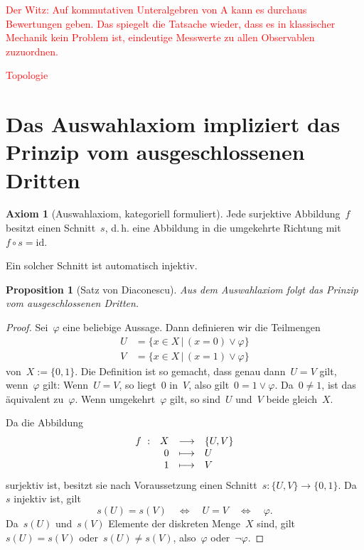 \documentclass[a4paper,ngerman,12pt]{scrartcl}
\theoremstyle{definition}
\newtheorem{axiom}[defn]{Axiom}
\theoremstyle{plain}
\newtheorem{prop}[defn]{Proposition}
\theoremstyle{remark}
\newcommand{\CC}{\mathbb{C}}
\newcommand{\C}{\mathcal{C}}
\newcommand{\id}{\mathrm{id}}
\renewcommand{\_}{\mathpunct{.}\,}
\newcommand{\?}{\,{:}\,}
\newcommand{\XXX}[1]{\textcolor{red}{#1}}
\begin{document}

\XXX{Der Witz: Auf kommutativen Unteralgebren von A kann es durchaus
Bewertungen geben. Das spiegelt die Tatsache wieder, dass es in
klassischer Mechanik kein Problem ist, eindeutige Messwerte zu allen
Observablen zuzuordnen.}

\XXX{Topologie}



\appendix
\section{Das Auswahlaxiom impliziert das Prinzip vom ausgeschlossenen Dritten}

\label{appendix:axc}%
\begin{axiom}[Auswahlaxiom, kategoriell formuliert]Jede surjektive
Abbildung~$f$ besitzt einen Schnitt~$s$, d.\,h. eine Abbildung in die
umgekehrte Richtung mit~$f \circ s = \id$.\end{axiom}
Ein solcher Schnitt ist automatisch injektiv.

\begin{prop}[Satz von Diaconescu]Aus dem Auswahlaxiom folgt das Prinzip vom ausgeschlossenen
Dritten.\end{prop}
\begin{proof}Sei~$\varphi$ eine beliebige Aussage. Dann definieren wir die
Teilmengen
\begin{align*}
  U &= \{ x \in X \,|\, (x = 0) \vee \varphi \} \\
  V &= \{ x \in X \,|\, (x = 1) \vee \varphi \}
\end{align*}
von~$X := \{ 0, 1 \}$. Die Definition ist so gemacht, dass genau dann~$U = V$
gilt, wenn~$\varphi$ gilt: Wenn~$U = V$, so liegt~$0$ in~$V$, also gilt~$0 = 1
\vee \varphi$. Da~$0 \neq 1$, ist das äquivalent zu~$\varphi$. Wenn umgekehrt~$\varphi$
gilt, so sind~$U$ und~$V$ beide gleich~$X$.

Da die Abbildung
\[ \begin{array}{@{}rrcl@{}}
  f\ : & X &\longrightarrow& \{U,V\} \\
  & 0 &\longmapsto& U \\
  & 1 &\longmapsto& V
\end{array} \]
surjektiv ist, besitzt sie nach Voraussetzung
einen Schnitt~$s : \{U,V\} \to \{0,1\}$. Da~$s$ injektiv ist, gilt
\[ s(U) = s(V) \quad\Longleftrightarrow\quad U = V
\quad\Longleftrightarrow\quad \varphi. \]
Da~$s(U)$ und~$s(V)$ Elemente der diskreten Menge~$X$ sind, gilt~$s(U) = s(V)$
oder~$s(U) \neq s(V)$, also~$\varphi$ oder~$\neg\varphi$.
\end{proof}
\end{document}
